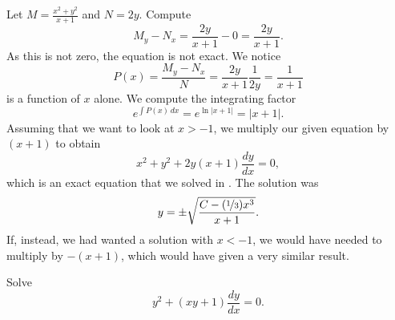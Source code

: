 \documentclass{ximera}
\begin{document}
\begin{exampleSol}
    Let $M= \frac{x^2+y^2}{x+1}$ and $N=2y$. Compute
    \begin{equation*}
        M_y-N_x = \frac{2y}{x+1} - 0 = \frac{2y}{x+1} .
    \end{equation*}
    As this is not zero, the equation is not exact.  We notice 
    \begin{equation*}
        P(x) = \frac{M_y-N_x}{N} = \frac{2y}{x+1} \frac{1}{2y} = \frac{1}{x+1} 
    \end{equation*}
    is a function of $x$ alone.    We compute the integrating factor
    \begin{equation*}
        e^{\int  P(x) \, dx} = e^{\ln |x+1|} = |x+1| .
    \end{equation*}
    Assuming that we want to look at $x > -1$, we multiply our given equation by $(x+1)$ to obtain
    \begin{equation*}
        x^2+y^2 + 2y(x+1) \frac{dy}{dx} = 0 ,
    \end{equation*}
    which is an exact equation that we solved in
    .  The solution was
    \begin{equation*}
        y = \pm \sqrt{\frac{C-(\nicefrac{1}{3})x^3}{x+1}} .
    \end{equation*}
    If, instead, we had wanted a solution with $x < -1$, we would have needed to multiply by $-(x+1)$, which would have given a very similar result. 
\end{exampleSol}

\begin{example}
    Solve
    \begin{equation*}
        y^2 + (xy+1) \frac{dy}{dx} = 0 .
    \end{equation*}
\end{example}
\end{document}
